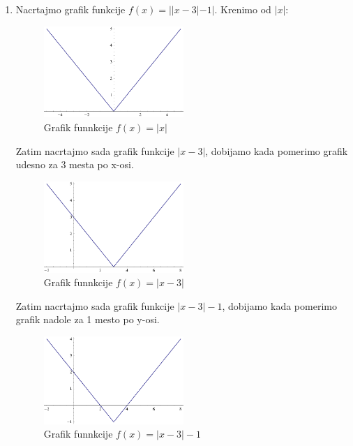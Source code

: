 \documentclass[a4paper,12pt]{report}
\begin{document}
\begin{enumerate}[1.]
\item Nacrtajmo grafik funkcije $f(x) = ||x-3|-1|$. Krenimo od $|x|$:
\begin{figure}[h!]
\begin{center}
\includegraphics[width=0.5\textwidth]{sl1.eps}
\caption{Grafik funnkcije $f(x) = |x|$}
\end{center}
\end{figure}

\par Zatim nacrtajmo sada grafik funkcije $|x-3|$, dobijamo kada pomerimo grafik udesno za 3 mesta po x-osi.
\newpage
\begin{figure}[h!]
\begin{center}
\includegraphics[width=0.5\textwidth]{sl2.eps}
\caption{Grafik funnkcije $f(x) = |x-3|$}
\end{center}
\end{figure}

\par Zatim nacrtajmo sada grafik funkcije $|x-3 | - 1$, dobijamo kada pomerimo grafik nadole za 1 mesto po y-osi.
\begin{figure}[h!]
\begin{center}
\includegraphics[width=0.5\textwidth]{sl3.eps}
\caption{Grafik funnkcije $f(x) = |x-3| -1$}
\end{center}
\end{figure}


\end{enumerate}
\end{document}
